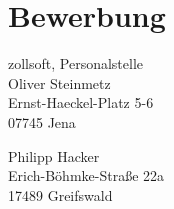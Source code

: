 \documentclass[11pt,a4paper]{moderncv}
\newcommand{\position}{%
    Softwareentwickler Machine-/Deep-Learning}
\begin{document}
    \newpage
    \makeatletter
    \chapter{Bewerbung}{}

    \vspace*{1.0cm}
    \begin{minipage}{0.6\textwidth}
        \begin{flushleft}
            zollsoft, Personalstelle\\%
            Oliver Steinmetz\\%
            Ernst-Haeckel-Platz 5-6\\%
            07745 Jena
        \end{flushleft}
    \end{minipage}
    \hfill
    \begin{minipage}{0.3\textwidth}
        \begin{flushright}
            Philipp Hacker\\%
            Erich-Böhmke-Straße 22a\\%
            17489 Greifswald
        \end{flushright}
    \end{minipage}
\end{document}
